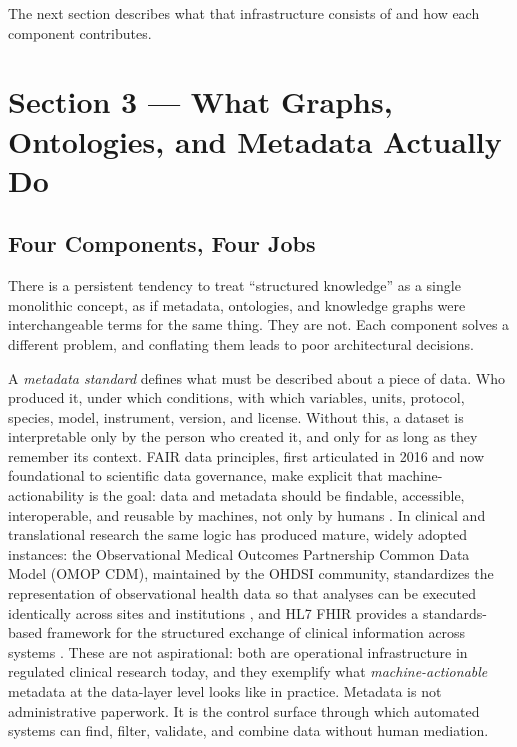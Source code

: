 \documentclass[man,12pt,donotrepeattitle]{apa7}
\begin{document}
The next section describes what that infrastructure consists of and how
each component contributes.


\section{Section 3 --- What Graphs, Ontologies, and Metadata Actually Do}

\subsection{Four Components, Four Jobs}

There is a persistent tendency to treat ``structured knowledge'' as a
single monolithic concept, as if metadata, ontologies, and knowledge graphs
were interchangeable terms for the same thing. They are not. Each component
solves a different problem, and conflating them leads to poor architectural
decisions.

A \textit{metadata standard} defines what must be described about a piece
of data. Who produced it, under which conditions, with which variables,
units, protocol, species, model, instrument, version, and license. Without
this, a dataset is interpretable only by the person who created it, and
only for as long as they remember its context. FAIR data principles, first
articulated in 2016 and now foundational to scientific data governance, make
explicit that machine-actionability is the goal: data and metadata should
be findable, accessible, interoperable, and reusable by machines, not only
by humans \parencite{wilkinson2016}. In clinical and translational research
the same logic has produced mature, widely adopted instances: the
Observational Medical Outcomes Partnership Common Data Model (OMOP CDM),
maintained by the OHDSI community, standardizes the representation of
observational health data so that analyses can be executed identically
across sites and institutions \parencite{hripcsak2015}, and HL7 FHIR
provides a standards-based framework for the structured exchange of clinical
information across systems \parencite{bender2013}. These are not
aspirational: both are operational infrastructure in regulated clinical
research today, and they exemplify what \textit{machine-actionable} metadata
at the data-layer level looks like in practice. Metadata is not
administrative paperwork. It is the control surface through which automated
systems can find, filter, validate, and combine data without human mediation.
\end{document}
